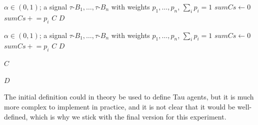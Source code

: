 \documentclass[11pt]{article}
\begin{document}
\begin{algorithm}[h]
\caption*{\textbf{Algorithm} $\tau$-DupocBot}
\begin{algorithmic}
\Require $\alpha \in (0,1)$; a signal $\tau$-$B_1,\dots,\tau$-$B_n$ with weights $p_1,\dots,p_n$, $\sum_i p_i = 1$
  \State $\mathit{sumCs} \gets 0$
      \State $\mathit{sumCs} \mathrel{+}= p_i$
    \EndIf
  \EndFor
   \Return $C$ \Else{} \Return $D$ \EndIf
\EndProcedure
\end{algorithmic}
\end{algorithm}

\begin{algorithm}[h]
\caption*{\textbf{Algorithm} $\tau$-TitForTatBot}
\begin{algorithmic}
\Require $\alpha \in (0,1)$; a signal $\tau$-$B_1,\dots,\tau$-$B_n$ with weights $p_1,\dots,p_n$, $\sum_i p_i = 1$
  \State $\mathit{sumCs} \gets 0$
      \State $\mathit{sumCs} \mathrel{+}= p_i$
    \EndIf
  \EndFor
   \Return $C$ \Else{} \Return $D$ \EndIf
\EndProcedure
\end{algorithmic}
\end{algorithm}

\begin{algorithm}[h]
\caption{$\tau$-CooperateBot: a concrete example of modified Def.~3}
\begin{algorithmic}
\Return $C$
\EndProcedure
\end{algorithmic}
\end{algorithm}
\begin{algorithm}[h]
\caption{$\tau$-DefectBot: a concrete example of modified Def.~3}
\begin{algorithmic}
\Return $D$
\EndProcedure
\end{algorithmic}
\end{algorithm}
The initial definition could in theory be used to define Tau agents, but it is much more complex to implement in practice, and it is not clear that it would be well-defined, which is why we stick with the final version for this experiment.
\end{document}
